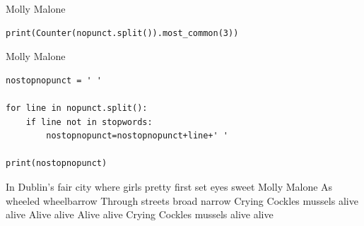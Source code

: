 \documentclass[handout]{beamer}
\begin{document}
\begin{frame}[fragile]{Molly Malone}
	
\begin{lstlisting}
print(Counter(nopunct.split()).most_common(3))
\end{lstlisting}
	
\begin{lstlistingoutput}
\end{lstlistingoutput}
	


\end{frame}

\begin{frame}[fragile]{Molly Malone}
	
\begin{lstlisting}
nostopnopunct = ' '

for line in nopunct.split():
	if line not in stopwords:
		nostopnopunct=nostopnopunct+line+' '

print(nostopnopunct)
\end{lstlisting}
	
\begin{lstlistingoutput}
In Dublin's fair city where girls pretty first set eyes sweet Molly Malone As wheeled wheelbarrow Through streets broad narrow Crying Cockles mussels alive alive Alive alive Alive alive Crying Cockles mussels alive alive
\end{lstlistingoutput}
	
\end{frame}
\end{document}
